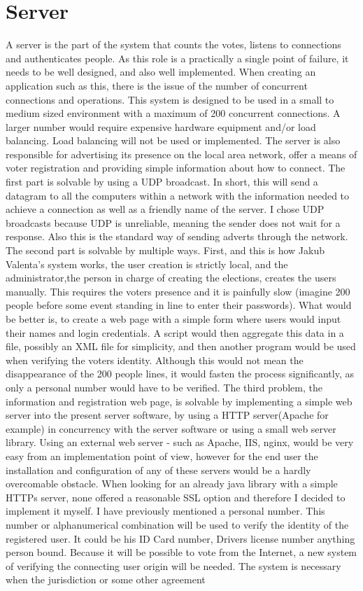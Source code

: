 \documentclass[11pt,twoside,a4paper]{book}
\begin{document}
\section{Server}
A server is the part of the system that counts the votes, listens to connections and authenticates people. As this role is a practically a single point of failure, it needs to be well designed, and also well implemented. When creating an application such as this, there is the issue of the number of concurrent connections and operations. This system is designed to be used in a small to medium sized environment with a maximum of 200 concurrent connections. A larger number would require expensive hardware equipment and/or load balancing. Load balancing will not be used or implemented. The server is also responsible for advertising its presence on the local area network, offer a means of voter registration and providing simple information about how to connect. The first part is solvable by using a UDP\cite{whatIsUPD} broadcast\cite{whatIsBroadcasting}. In short, this will send a datagram to all the computers within a network with the information needed to achieve a connection as well as a friendly name of the server. I chose UDP broadcasts because UDP is unreliable, meaning the sender does not wait for a response. Also this is the standard way of sending adverts through the network. The second part is solvable by multiple ways. First, and this is how Jakub Valenta's system works, the user creation is strictly local, and the administrator,the person in charge of creating the elections, creates the users manually. This requires the voters presence and  it is painfully slow (imagine 200 people before some event standing in line to enter their passwords). What would be better is, to create a web page with a simple form where users would input their names and login credentials. A script would then aggregate this data in a file, possibly an XML file for simplicity, and then another program would be used when verifying the voters identity. Although this would not mean the disappearance of the 200 people lines, it would fasten the process significantly, as only a personal number would have to be verified. The third problem, the information and registration web page, is solvable by implementing a simple web server into the present server software, by using a HTTP server(Apache for example)  in concurrency with the server software or using a small web server library. Using an external web server - such as Apache, IIS, nginx, would be very easy from an implementation point of view, however for the end user the installation and configuration of any of these servers would be a hardly overcomable obstacle. When looking for an already java library with a simple HTTPs server, none offered a reasonable SSL option and therefore I decided to implement it myself. I have previously mentioned a personal number. This number or alphanumerical combination will be used to verify the identity of the registered user. It could be his ID Card number, Drivers license number anything person bound. Because it will be possible to vote from the Internet, a new system of verifying the connecting user origin will be needed. The system is necessary when the jurisdiction or some other agreement 
\end{document}
